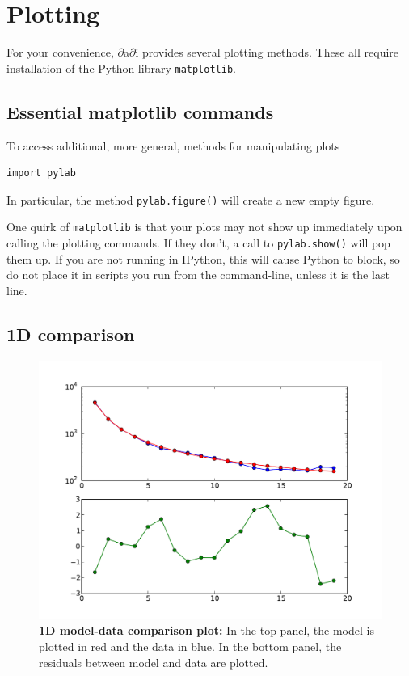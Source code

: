 \documentclass[12pt]{article}
\makeatletter
\newcommand{\dadi}{$\partial$a$\partial$i\xspace}
\newcommand{\py}[1]{\lstinline[language=Python, showstringspaces=False]@#1@}
\makeatother
\begin{document}
\section{Plotting}

For your convenience, \dadi provides several plotting methods.
These all require installation of the Python library \py{matplotlib}.

\subsection{Essential matplotlib commands}
To access additional, more general, methods for manipulating plots
\begin{lstlisting}
import pylab
\end{lstlisting}
In particular, the method \py{pylab.figure()} will create a new empty figure.

One quirk of \py{matplotlib} is that your plots may not show up immediately upon calling the plotting commands.
If they don't, a call to \py{pylab.show()} will pop them up.
If you are not running in IPython, this will cause Python to block, so do not place it in scripts you run from the command-line, unless it is the last line.

\subsection{1D comparison}

\begin{figure}
\centering
\includegraphics[scale=0.5]{1d_comp}
\caption{\textbf{1D model-data comparison plot:} In the top panel, the model is plotted in red and the data in blue. In the bottom panel, the residuals between model and data are plotted.\label{fig:1d_comp}}
\end{figure}
\end{document}

